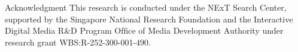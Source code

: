 \documentclass{sig-alternate}
\begin{document}
Acknowledgment This research is conducted under the NExT Search Center, supported by the Singapore National Research Foundation and the Interactive \cite{saini2012movimash} Digital Media R\&D Program Ofﬁce of Media Development Authority under research grant WBS:R-252-300-001-490.








%

\end{document}

